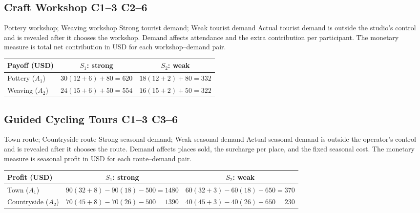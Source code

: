 \clearpage
{}
{\small
\subsection{Craft Workshop \hfill C1--3 C2--6}
\label{summary:craft-workshop}
\DecisionElementsTable
{Pottery workshop; Weaving workshop}
{Strong tourist demand; Weak tourist demand}
{Actual tourist demand is outside the studio's control and is revealed after it chooses the workshop.}
{Demand affects attendance and the extra contribution per participant. The monetary measure is total net contribution in USD for each workshop--demand pair.}
\begin{center}
\begin{tabular}{@{}lcc@{}}\toprule
Payoff (USD) & $S_1$: strong & $S_2$: weak\\\midrule
Pottery ($A_1$) & $30(12+6)+80=620$ & $18(12+2)+80=332$\\
Weaving ($A_2$) & $24(15+6)+50=554$ & $16(15+2)+50=322$\\
\bottomrule\end{tabular}
\end{center}
\subsection{Guided Cycling Tours \hfill C1--3 C3--6}
\label{summary:guided-cycling-tours}
\DecisionElementsTable
{Town route; Countryside route}
{Strong seasonal demand; Weak seasonal demand}
{Actual seasonal demand is outside the operator's control and is revealed after it chooses the route.}
{Demand affects places sold, the surcharge per place, and the fixed seasonal cost. The monetary measure is seasonal profit in USD for each route--demand pair.}
\begin{center}
\begin{tabular}{@{}lcc@{}}\toprule
Profit (USD) & $S_1$: strong & $S_2$: weak\\\midrule
Town ($A_1$) & $90(32+8)-90(18)-500=1480$ & $60(32+3)-60(18)-650=370$\\
Countryside ($A_2$) & $70(45+8)-70(26)-500=1390$ & $40(45+3)-40(26)-650=230$\\
\bottomrule\end{tabular}
\end{center}
}
